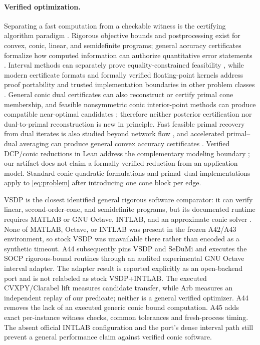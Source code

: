 \documentclass[smallextended,envcountsect]{svjour3}
\begin{document}
\paragraph{Verified optimization.}
Separating a fast computation from a checkable witness is the certifying
algorithm paradigm \citep{mcconnell2011certifying}.  Rigorous objective bounds
and postprocessing exist for convex, conic, linear, and semidefinite programs;
general accuracy certificates formalize how computed information can authorize
quantitative error statements
\citep{nemirovski2010accuracy,jansson2009verified,jansson2004convex,
jansson2007conic,jansson2007rigorous,lange2020verification,rump2010verification}.
Interval methods can separately prove equality-constrained feasibility
\citep{kearfott1998feasible}, while modern certificate formats and formally
verified floating-point kernels address proof portability and trusted
implementation boundaries in other problem classes
\citep{szeider2026vipr,kohlen2025verified}.
General conic dual certificates can also reconstruct or certify primal cone
membership, and feasible nonsymmetric conic interior-point methods can produce
compatible near-optimal candidates
\citep{lee2025dual,papp2025fullnewton}; therefore neither posterior
certification nor dual-to-primal reconstruction is new in principle.
Fast feasible primal recovery from dual iterates is also studied beyond network
flow \citep{parshakova2025multiple}, and accelerated primal--dual averaging can
produce general convex accuracy certificates \citep{burns2026accuracy}.
Verified DCP/conic reductions in Lean address the complementary modeling
boundary \citep{bentkamp2023verified}; our artifact does not claim a formally
verified reduction from an application model.  Standard conic quadratic
formulations and primal--dual implementations
\citep{andersen2003conic,goulart2026clarabel,diamond2016cvxpy} apply to
\cref{eq:problem} after introducing one cone block per edge.

VSDP is the closest identified general rigorous software comparator: it can
verify linear, second-order-cone, and semidefinite programs, but its documented
runtime requires MATLAB or GNU Octave, INTLAB, and an approximate conic solver
\citep{vsdp2020}.  None of MATLAB, Octave, or INTLAB was present in the frozen
A42/A43 environment, so stock VSDP was unavailable there rather than encoded
as a synthetic timeout.  A44 subsequently pins VSDP and SeDuMi and executes
the SOCP rigorous-bound routines through an audited experimental GNU Octave
interval adapter.  The adapter result is reported explicitly as an open-backend
port and is not relabeled as stock VSDP+INTLAB.  The executed CVXPY/Clarabel
lift measures candidate transfer, while Arb measures an independent replay of
our predicate; neither is a general verified optimizer.  A44 removes the lack
of an executed generic conic bound computation. A45 adds exact per-instance
witness checks, common tolerances and fresh-process timing. The absent official
INTLAB configuration and the port's dense interval path still prevent a general
performance claim against verified conic software.
\end{document}
